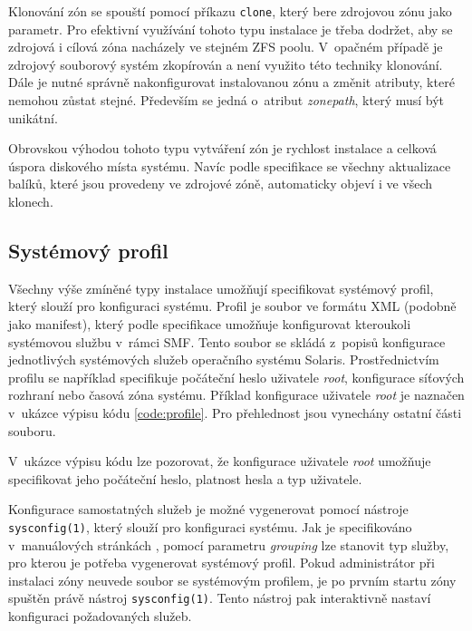 Klonování zón se spouští pomocí příkazu \verb|clone|, který bere zdrojovou zónu jako parametr. Pro efektivní
využívání tohoto typu instalace je třeba dodržet, aby se zdrojová i cílová zóna nacházely ve stejném ZFS poolu.
V~opačném případě je zdrojový souborový systém zkopírován a není využito této techniky klonování. Dále je nutné
správně nakonfigurovat instalovanou zónu a změnit atributy, které nemohou zůstat stejné. Především se jedná o~atribut
\textit{zonepath}, který musí být unikátní.

Obrovskou výhodou tohoto typu vytváření zón je rychlost instalace a celková úspora diskového místa systému. Navíc podle specifikace
\cite{oracle:solaris:zones:clonning} se všechny aktualizace balíků, které jsou provedeny ve zdrojové zóně, automaticky objeví i ve
všech klonech.
\subsection{Systémový profil}
\label{chapter:zones:instalation:profile}
Všechny výše zmíněné typy instalace umožňují specifikovat systémový profil, který slouží pro konfiguraci systému. Profil je soubor
ve formátu XML (podobně jako manifest), který podle specifikace \cite{oracle:solaris:zones:profile} umožňuje konfigurovat
kteroukoli systémovou službu v~rámci SMF. Tento soubor se skládá z~popisů konfigurace jednotlivých systémových služeb
operačního systému Solaris. Prostřednictvím profilu se například specifikuje počáteční heslo uživatele \textit{root}, konfigurace 
síťových rozhraní nebo časová zóna systému. Příklad konfigurace uživatele \textit{root} je naznačen v~ukázce výpisu kódu \ref{code:profile}.
Pro přehlednost jsou vynechány ostatní části souboru.
V~ukázce výpisu kódu lze pozorovat, že konfigurace uživatele \textit{root} umožňuje specifikovat jeho počáteční heslo, platnost
hesla a typ uživatele.

Konfigurace samostatných služeb je možné vygenerovat pomocí nástroje \verb|sysconfig(1)|, který slouží pro konfiguraci systému.
Jak je specifikováno v~manuálových stránkách \cite{oracle:manpages:sysconfig}, pomocí parametru \textit{grouping} lze stanovit typ
služby, pro kterou je potřeba vygenerovat systémový profil. Pokud administrátor při instalaci zóny neuvede soubor se systémovým
profilem, je po prvním startu zóny spuštěn právě nástroj \verb|sysconfig(1)|. Tento nástroj pak interaktivně nastaví konfiguraci
požadovaných služeb.
